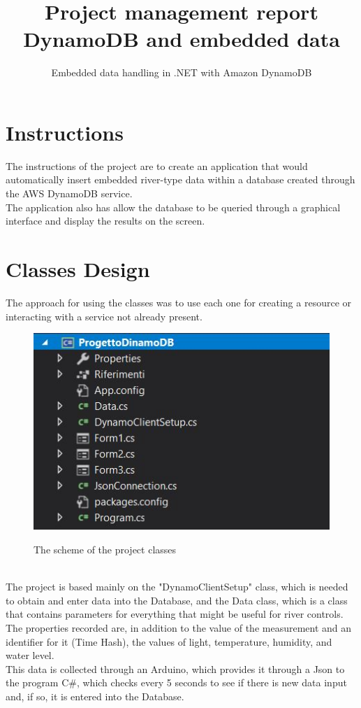 \documentclass[]{article}
\begin{document}
\title{
  Project management report \\
 \Large{ DynamoDB and embedded data}
}
\author{Embedded data handling in .NET with Amazon DynamoDB} %
\maketitle
	\section{Instructions}\label{intro}
	The instructions of the project are to create an application that would automatically insert embedded river-type data within a database created through the AWS DynamoDB service.\\
	The application also has allow the database to be queried through a graphical interface and display the results on the screen.
	\section{Classes Design}
	The approach for using the classes was to use each one for creating a resource or interacting with a service not already present.
	\begin{figure}[h!]
		\centering
		\includegraphics[width=0.5\columnwidth]{ProgettoDinamoDBclassi.JPG}
		\label{figClasses}
		\caption*{The scheme of the project classes}
	\end{figure}\\
	The project is based mainly on the "DynamoClientSetup" class, which is needed to obtain and enter data into the Database, and the Data class, which is a class that contains parameters for everything that might be useful for river controls.
	The properties recorded are, in addition to the value of the measurement and an identifier for it (Time Hash), the values of light, temperature, humidity, and water level.\\
	This data is collected through an Arduino, which provides it through a Json to the program C\#, which checks every 5 seconds to see if there is new data input and, if so, it is entered into the Database.
	\pagebreak
\end{document}
